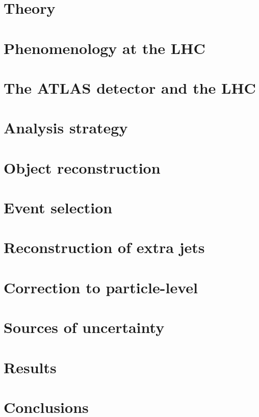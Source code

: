 \documentclass[12pt]{ucbthesis}
\begin{document}
\chapter{Theory}
\label{ch:theory}

\chapter{Phenomenology at the LHC}
\label{ch:pheno}


\chapter{The ATLAS detector and the LHC}
\label{ch:atlas}

\chapter{Analysis strategy}
\label{ch:strategy}

\chapter{Object reconstruction}
\label{ch:objects}

\chapter{Event selection}
\label{ch:event}

\chapter{Reconstruction of extra jets}
\label{ch:extrajets}

\chapter{Correction to particle-level}
\label{ch:unfolding}

\chapter{Sources of uncertainty}
\label{ch:syst}

\chapter{Results}
\label{ch:results}

\chapter{Conclusions}
\label{ch:conclusions}

\end{document}
